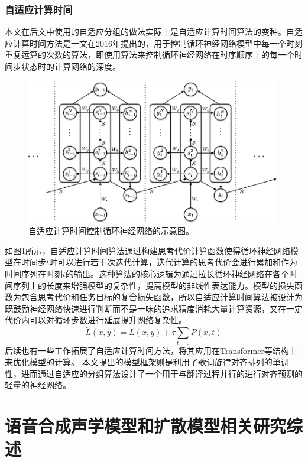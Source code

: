 \subsubsection{自适应计算时间}
本文在后文中使用的自适应分组的做法实际上是自适应计算时间算法的变种。自适应计算时间方法是\citet{act}一文在2016年提出的，用于控制循环神经网络模型中每一个时刻重复运算的次数的算法，即使用算法来控制循环神经网络在时序顺序上的每一个时间步状态时的计算网络的深度。
\begin{figure}[ht]
  \includegraphics[width=0.99\textwidth]{figure/related/act.png}
  \caption{自适应计算时间控制循环神经网络的示意图。}
  \label{fig:act_rnn}
\end{figure}
如图\ref{fig:act_rnn}所示，自适应计算时间算法通过构建思考代价计算函数使得循环神经网络模型在时间步$t$时可以进行若干次迭代计算，迭代计算的思考代价会进行累加和作为时间序列在时刻$t$的输出。这种算法的核心逻辑为通过拉长循环神经网络在各个时间序列上的长度来增强模型的复杂性，提高模型的非线性表达能力。模型的损失函数为包含思考代价和任务目标的复合损失函数，所以自适应计算时间算法被设计为既鼓励神经网络快速进行判断而不是一味的追求精度消耗大量计算资源，又在一定代价内可以对循环步数进行延展提升网络复杂性。
\begin{equation*}
  \tilde{L}(x,y)=L(x,y)+\tau \sum_{t=0} P(x,t)
\end{equation*}
后续也有一些工作拓展了自适应计算时间方法，将其应用在Transformer等结构上来优化模型的计算。
本文提出的模型框架则是利用了歌词旋律对齐排列的单调性，进而通过自适应的分组算法设计了一个用于与翻译过程并行的进行对齐预测的轻量的神经网络。
\section{语音合成声学模型和扩散模型相关研究综述}
